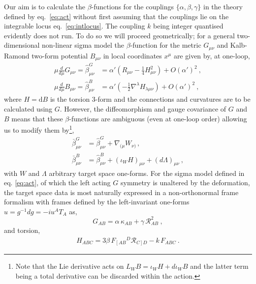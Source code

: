 \documentclass[12pt]{article}
\def\ee{\boldsymbol{e}}
\def\R{{\mathbb R}}
\def\be{\begin{equation}}
\def\ee{\end{equation}}
\renewcommand{\R}{\mathcal{R}}
\begin{document}
 Our aim is to calculate the $\beta$-functions for the couplings $\{ \alpha, \beta ,\gamma\}$ in the theory  defined by eq.~\eqref{eq:act}  without first assuming that the couplings lie on the integrable locus eq.~\eqref{eq:intlocus}.   The coupling $k$ being integer quantised evidently does not run.  To do so we will proceed geometrically; for a general two-dimensional non-linear sigma model the $\beta$-function for the metric $G_{\mu \nu}$ and Kalb-Ramond two-form potential   $B_{\mu \nu}$ in local coordinates $x^{\mu}$ are given by, at one-loop,  
 \be
  \begin{aligned}\label{eq:beta1}
 \mu \frac{d }{ d\mu} G_{\mu \nu} =   \hat\beta_{\mu \nu}^{G} &=  \alpha' \left(R_{\mu \nu} - \frac{1}{ 4} H^2_{\mu \nu}   \right)  + O( \alpha')^2 \ ,  \\ 
   \mu \frac{d }{ d\mu} B_{\mu \nu} = \hat\beta^{B}_{\mu \nu} &=    \alpha' \left( -\frac{1}{2} \nabla^\lambda H_{\lambda \mu \nu}  \right) + O( \alpha')^2 \ ,
    \end{aligned}       
   \ee
   where $H = \mathrm{d}B$ is the torsion 3-form and the connections and curvatures are to be calculated using $G$.  However, the diffeomorphism and gauge covariance of $G$ and $B$ means that these $\beta$-functions are ambiguous (even at one-loop order) 
 \cite{Shore:1986hk,Tseytlin:1986ws}  allowing us to modify them by\footnote{Note that the Lie derivative acts on $L_W B =  \iota_W H + d  \iota_W B$ and the latter term being a total derivative can be discarded within the action.},
  \be  \begin{aligned}\label{eq:diffeogauge}
\bar\beta^{G}_{\mu \nu } &=  \hat\beta^{G}_{\mu \nu }+ \nabla_{(\mu} W_{\nu)}\,, \\ 
\bar\beta^{B}_{\mu \nu }  &=     \hat\beta^{B}_{\mu \nu } + (\iota_W H)_{\mu \nu }  + (d\Lambda)_{\mu \nu}  \ , 
    \end{aligned} 
\ee
with $W$ and $\Lambda$ arbitrary target space one-forms. For the sigma model defined in eq. \eqref{eq:act}, of which the left acting $G$ symmetry is unaltered by the deformation, the target space data is most naturally expressed in a non-orthonormal frame formalism with frames defined by the left-invariant one-forms $u= g^{-1}dg  = - i u^A T_A$ as,
 \be\label{eq:metricansatz}
 G_{AB} =  \alpha\, \kappa_{AB} +\gamma\,  \R^{2}_{AB} \ ,
 \ee
 and torsion,
 \begin{eqnarray}\label{eq:torsion}
H_{ABC}= 3 \beta\, F_{\left[AB\right.}{}^{D}\R_{\left.C\right]D} - k\, F_{ABC} \ .
\end{eqnarray} 
\end{document}
